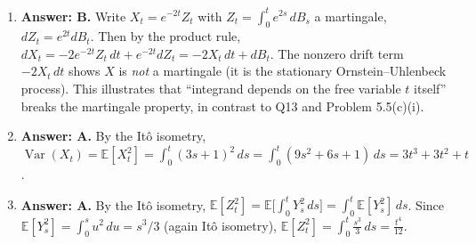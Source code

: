 \documentclass[11pt]{article}
\newcommand{\E}{\mathbb{E}}
\DeclareMathOperator{\Var}{Var}
\newcommand{\ans}[1]{\par\noindent\textbf{\color{blue!50!black}Answer: #1}}
\begin{document}
\begin{enumerate}
\item[\textbf{Q14.}] \ans{B.} Write $X_t=e^{-2t}Z_t$ with $Z_t=\int_0^te^{2s}\,dB_s$ a martingale, $dZ_t=e^{2t}dB_t$. Then by the product rule, $dX_t=-2e^{-2t}Z_t\,dt+e^{-2t}dZ_t=-2X_t\,dt+dB_t$. The nonzero drift term $-2X_t\,dt$ shows $X$ is \emph{not} a martingale (it is the stationary Ornstein--Uhlenbeck process). This illustrates that ``integrand depends on the free variable $t$ itself'' breaks the martingale property, in contrast to Q13 and Problem 5.5(c)(i).

\item[\textbf{Q15.}] \ans{A.} By the Itô isometry, $\Var(X_t)=\E[X_t^2]=\int_0^t(3s+1)^2\,ds=\int_0^t(9s^2+6s+1)\,ds=3t^3+3t^2+t$.

\item[\textbf{Q16.}] \ans{A.} By the Itô isometry, $\E[Z_t^2]=\E\Big[\int_0^tY_s^2\,ds\Big]=\int_0^t\E[Y_s^2]\,ds$. Since $\E[Y_s^2]=\int_0^su^2\,du=s^3/3$ (again Itô isometry), $\E[Z_t^2]=\int_0^t\frac{s^3}{3}\,ds=\frac{t^4}{12}$.

\end{enumerate}
\end{document}
